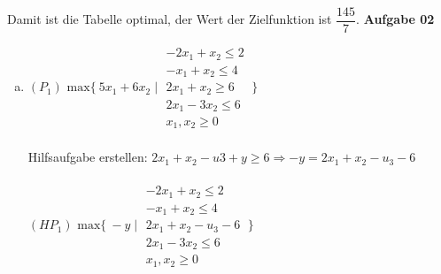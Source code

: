 \documentclass[a4paper,10pt]{article}
\begin{document}
	Damit ist die Tabelle optimal, der Wert der Zielfunktion ist $\dfrac{145}{7}$.
	\newpage
	\textbf{Aufgabe 02}\\
	\begin{enumerate}[a)]
		\item 
		$ (P_1) \text{ max} \{\ 5x_1 + 6x_2 \mid \begin{matrix}
		-2x_1 + x_2 \leq 2\\
		-x_1 + x_2 \leq 4\\
		2x_1 + x_2 \geq 6\\
		2x_1 - 3x_2 \leq 6\\
		x_1, x_2 \geq 0
		\end{matrix}
		\ \} $\\\\
		Hilfsaufgabe erstellen: $2x_1 + x_2 -u3 + y \geq 6 \Rightarrow -y = 2x_1 + x_2 -u_3 - 6$\\\\
		$ (HP_1) \text{ max} \{\ -y \mid \begin{matrix}
		-2x_1 + x_2 \leq 2\\
		-x_1 + x_2 \leq 4\\
		2x_1 + x_2 -u_3 - 6\\
		2x_1 - 3x_2 \leq 6\\
		x_1, x_2 \geq 0
		\end{matrix}
		\ \} $
		

\end{enumerate}
\end{document}
